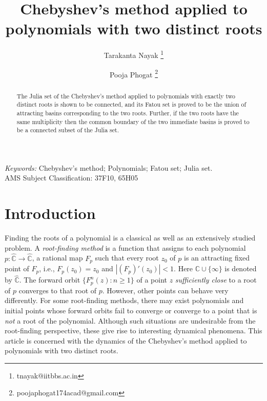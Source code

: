 \documentclass[12pt]{article}
\date{}
\begin{document}
\title{Chebyshev's method applied to polynomials with two distinct roots}
\author[1]{Tarakanta Nayak 
    \footnote{ tnayak@iitbbs.ac.in}}
\author[1]{Pooja Phogat  \footnote{ poojaphogat174acad@gmail.com}}
	\date{}
\maketitle
\begin{abstract}
The Julia set of the Chebyshev's method applied to polynomials with exactly two distinct roots is shown to be connected, and  its Fatou set is proved to be the union of attracting basins corresponding to the two roots. Further, if the two roots have the same multiplicity then the common boundary of the two immediate basins is proved to be a connected subset of the Julia set. 
\end{abstract}
\textit{Keywords:}
Chebyshev's method; Polynomials; Fatou set; Julia set.\\
AMS Subject Classification: 37F10, 65H05

\section{Introduction}
Finding the roots of a polynomial is a classical as well as an extensively studied problem.  
A \textit{root-finding method} is a function that assigns to each polynomial $p: \widehat{\mathbb{C}} \to \widehat{\mathbb{C}}$, a rational map $F_p$ such that every root $z_0$ of $p$ is an attracting fixed point of $F_p$, i.e., $F_p (z_0)=z_0$ and $|(F_p)'(z_0)|<1$. Here $\mathbb{C} \cup \{\infty\} $ is denoted by $ \widehat{\mathbb{C}}$. The forward orbit $\{F_p ^n (z): n \geq 1\}$ of a point $z$ \textit{sufficiently close} to a root of $p$ converges to that root of $p$.  
However, other points can behave very differently.  For some root-finding methods, there may exist polynomials and initial points whose forward orbits fail to converge or converge to a point that is \textit{not} a root of the polynomial. Although such situations are undesirable from the  root-finding perspective, these give rise to interesting dynamical phenomena.
This article is concerned with the dynamics of the Chebyshev's method applied to polynomials with two distinct roots.
\end{document}
